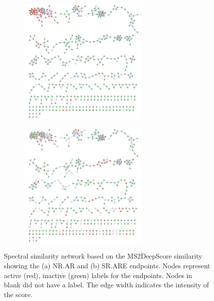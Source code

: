 \begin{figure}[h]
  \centering
	 \begin{subfigure}[a]{1\textwidth}
 		 \centering
  		\includegraphics[width=0.7\textwidth]{include/img/net/NR.AR_MS2DeepScore.pdf}
 		 \caption{}
 	\end{subfigure}
 	\hfill
 		 \begin{subfigure}[a]{1\textwidth}
 		 \centering
 		 \includegraphics[width=0.7\textwidth]{include/img/net/NR.ER_MS2DeepScore.pdf}
 		 \caption{}
 	\end{subfigure}
  \caption{Spectral similarity network based on the MS2DeepScore similarity showing the (a) NR.AR and (b) SR.ARE endpoints. Nodes represent active (red), inactive (green) labels for the endpoints. Nodes in blank did not have a label. The edge width indicates the intensity of the score.}
  \label{fig:MS2DS_networks}
\end{figure}

